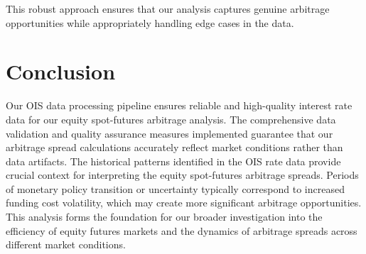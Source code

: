 \documentclass{article}
\begin{document}
This robust approach ensures that our analysis captures genuine arbitrage opportunities while appropriately handling edge cases in the data.

\section{Conclusion}
Our OIS data processing pipeline ensures reliable and high-quality interest rate data for our equity spot-futures arbitrage analysis. The comprehensive data validation and quality assurance measures implemented guarantee that our arbitrage spread calculations accurately reflect market conditions rather than data artifacts. The historical patterns identified in the OIS rate data provide crucial context for interpreting the equity spot-futures arbitrage spreads. Periods of monetary policy transition or uncertainty typically correspond to increased funding cost volatility, which may create more significant arbitrage opportunities. This analysis forms the foundation for our broader investigation into the efficiency of equity futures markets and the dynamics of arbitrage spreads across different market conditions.
\end{document}
